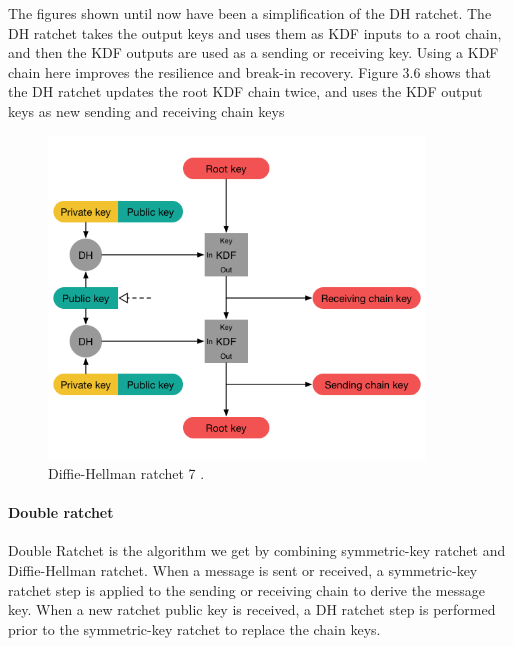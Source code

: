 The figures shown until now have been a simplification of the DH
ratchet. The DH ratchet takes the output keys and uses them as KDF inputs
to a root chain, and then the KDF outputs are used as a sending or receiving
key. Using a KDF chain here improves the resilience and break-in recovery.
Figure 3.6 shows that the DH ratchet updates the root KDF chain twice, and
uses the KDF output keys as new sending and receiving chain keys


\begin{figure}[H]
	\centering
	\includegraphics[width=10cm]{figures/dhratchet7.png}
	\caption{Diffie-Hellman ratchet 7 \cite{doubleratchet}.}
	\label{fig:dhratchet7}
\end{figure}

\paragraph{Double ratchet}
Double Ratchet is the algorithm we get by combining symmetric-key
ratchet and Diffie-Hellman ratchet. 
When a message is sent or received, a symmetric-key ratchet step is
applied to the sending or receiving chain to derive the message key.
When a new ratchet public key is received, a DH ratchet step is performed prior to the symmetric-key ratchet to replace the chain keys.

